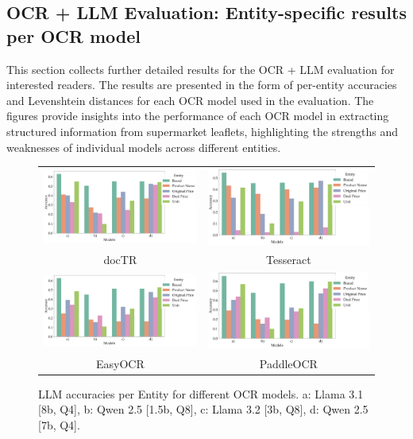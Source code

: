 \documentclass[11pt]{article}
\begin{document}
\subsection{OCR + LLM Evaluation: Entity-specific results per OCR model}
\label{app:ocr_llm_results}

This section collects further detailed results for the OCR + LLM evaluation for interested readers. The results are presented in the form of per-entity accuracies and Levenshtein distances for each OCR model used in the evaluation. The figures provide insights into the performance of each OCR model in extracting structured information from supermarket leaflets, highlighting the strengths and weaknesses of individual models across different entities.

\begin{figure}[h!]
    \begin{tabular}{cc}
      \includegraphics[width=0.5\linewidth]{figures/doctr_ocr_accuracies.png} &   \includegraphics[width=0.5\linewidth]{figures/tesseract_ocr_accuracies.png} \\
    docTR & Tesseract \\[6pt]
        \includegraphics[width=0.5\linewidth]{figures/easyocr_ocr_accuracies.png} &   \includegraphics[width=0.5\linewidth]{figures/ppocr_ocr_accuracies.png} \\
    EasyOCR & PaddleOCR \\[6pt]
    \end{tabular}
    \caption{LLM accuracies per Entity for different OCR models. a: Llama 3.1 [8b, Q4], b: Qwen 2.5 [1.5b, Q8], c: Llama 3.2 [3b, Q8], d: Qwen 2.5 [7b, Q4].}
    \label{fig:eval_ocr_llm_accuracies}
\end{figure}
\end{document}
